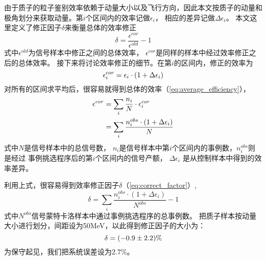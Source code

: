 由于质子的粒子鉴别效率依赖于动量大小以及飞行方向，因此本文按质子的动量和
极角划分来获取动量。第$i$个区间内的效率记做$\epsilon_{i}$，
相应的差异记做$\Delta \epsilon_{i}$。
本文这里定义了修正因子$\delta$来衡量总体的效率修正
\begin{equation}
    \delta = \frac{\epsilon^{cor}}{\epsilon^{old}} -1   
    \label{eq:corr-factor}
\end{equation}
式中$\epsilon^{old}$为信号样本中修正之间的总体效率，
$\epsilon^{cor}$是同样的样本中经过效率修正之后的总体效率。
接下来将讨论效率修正的细节。在第$i$的区间内，修正的效率为
\begin{equation}
    \epsilon^{cor}_{i} = \epsilon_{i} \cdot (1+ \Delta \epsilon_{i}) \notag
\end{equation}
对所有的区间求平均后，很容易就得到总体的效率（\ref{eq:average_efficiency}），
\begin{equation}
    \label{eq:average_efficiency}
    \begin{aligned}
        \epsilon^{cor} &= \sum _{i} \frac{n_{i}}{N} \cdot
        \epsilon^{cor}_{i} \notag \\
        &= \sum_{i} \frac{n_{i}^{obs} \cdot (1+ \Delta \epsilon_{i}) }{N} 
    \end{aligned}
\end{equation}
式中$N$是信号样本中的总信号数，
$n_{i}$是信号样本中第$i$个区间内的事例数，$n^{obs}_{i}$则是经过
事例挑选程序后的第$i$个区间内的信号产额，
$\Delta \epsilon_{i}$ 是从控制样本中得到的效率差异。

利用上式，很容易得到效率修正因子$\delta$（\ref{eq:correct_factor}）,
\begin{equation}
    \label{eq:correct_factor}
    \delta  = \sum_{i} \frac{n_{i}^{obs} \cdot (1+ \Delta
\epsilon_{i})}{N^{obs}} -1 
\end{equation}
式中$N^{obs}$信号蒙特卡洛样本中通过事例挑选程序的总事例数。
把质子样本按动量大小进行划分，间距设为50MeV，以此得到修正因子的大小为：
 \begin{equation}
     \delta = (-0.9 \pm 2.2)\% \notag 
 \end{equation}
为保守起见，我们把系统误差设为$2.7\%$。


